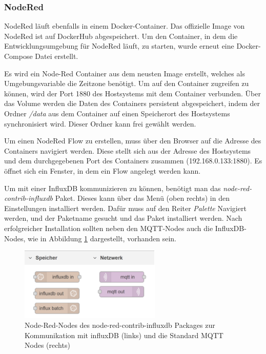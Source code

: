 \documentclass[a4paper, 12pt, oneside, toc=listofnumbered, bibliography=totoc]{scrbook}
\begin{document}
			\subsubsection{NodeRed}
			
			NodeRed läuft ebenfalls in einem Docker-Container. Das offizielle Image von NodeRed ist auf DockerHub abgespeichert. Um den Container, in dem die Entwicklungsumgebung für NodeRed läuft, zu starten, wurde erneut eine Docker-Compose Datei erstellt. 
			
			
			
			Es wird ein Node-Red Container aus dem neusten Image erstellt, welches als Umgebungsvariable die Zeitzone benötigt. Um auf den Container zugreifen zu können, wird der Port 1880 des Hostsystems mit dem Container verbunden. Über das Volume werden die Daten des Containers persistent abgespeichert, indem der Ordner \textit{/data} aus dem Container auf einen Speicherort des Hostsystems synchronisiert wird. Dieser Ordner kann frei gewählt werden.
			
			Um einen NodeRed Flow zu erstellen, muss über den Browser auf die Adresse des Containers navigiert werden. Diese stellt sich aus der Adresse des Hostsystems und dem durchgegebenen Port des Containers zusammen (192.168.0.133:1880). Es öffnet sich ein Fenster, in dem ein Flow angelegt werden kann.
			
			Um mit einer InfluxDB kommunizieren zu können, benötigt man das \textit{node-red-contrib-influxdb} Paket. Dieses kann über das Menü (oben rechts) in den Einstellungen installiert werden. Dafür muss auf den Reiter \textit{Palette} Navigiert werden, und der Paketname gesucht und das Paket installiert werden. Nach erfolgreicher Installation sollten neben den MQTT-Nodes auch die InfluxDB-Nodes, wie in Abbildung \ref{fig:nodes} dargestellt, vorhanden sein.
			
			\begin{figure}[H]
				\centering
				\includegraphics[width=0.6\textwidth]{res/NodeRedNodes.png}
				\caption{Node-Red-Nodes des node-red-contrib-influxdb Packages zur Kommunikation mit influxDB (links) und die Standard MQTT Nodes (rechts)}
				\label{fig:nodes}
			\end{figure}
		
\end{document}
